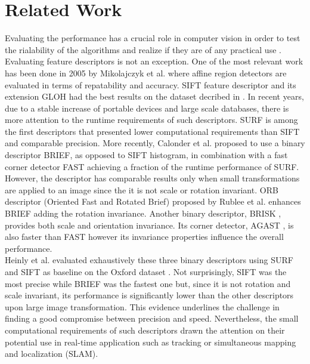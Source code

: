 \section{Related Work}
\label{sec:relatedwork}

Evaluating the performance has a crucial role in computer vision in order to test the rialability of the algorithms and realize if they are of any practical use \cite{christensen02}. Evaluating feature descriptors is not an exception. One of the most relevant work has been done in 2005 by Mikolajczyk et al. \cite{mikolajczyk05} where affine region detectors are evaluated in terms of repatability and accuracy. SIFT feature descriptor \cite{lowe04} and its extension GLOH \cite{mikolajczyk05} had the best results on the dataset decribed in \cite{mikolajczyk2005b}. In recent years, due to a stable increase of portable devices and large scale databases, there is more attention to the runtime requirements of such descriptors. SURF \cite{bay2008} is among the first descriptors that presented lower computational requirements than SIFT and comparable precision. More recently, Calonder et al. \cite{calonder10} proposed to use a binary descriptor BRIEF, as opposed to SIFT histogram, in combination with a fast corner detector FAST \cite{rosten06} achieving a fraction of the runtime performance of SURF. However, the descriptor has comparable results only when small transformations are applied to an image since the it is not scale or rotation invariant. ORB descriptor (Oriented Fast and Rotated Brief) proposed by Rublee et al. \cite{rublee11} enhances BRIEF adding the rotation invariance. Another binary descriptor, BRISK \cite{leutenegger11}, provides both scale and orientation invariance. Its corner detector, AGAST \cite{mair2010} , is also faster than FAST however its invariance properties influence the overall performance.\\ 
Heinly et al. \cite{heinly2012} evaluated exhaustively these three binary descriptors using SURF and SIFT as baseline on the Oxford dataset \cite{mikolajczyk2005b}. Not surprisingly, SIFT was the most precise while BRIEF was the fastest one but, since it is not rotation and scale invariant, its performance is significantly lower than the other descriptors upon large image transformation. This evidence underlines the challenge in finding a good compromise between precision and speed. Nevertheless, the small computational requirements of such descriptors drawn the attention on their potential use in real-time application such as tracking or simultaneous mapping and localization (SLAM). \\
